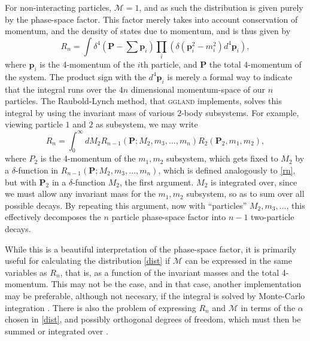 \documentclass[12pt, a4paper]{article}
\newcommand{\fvec}[1]{\boldsymbol{#1}}
\newcommand{\me}{\ensuremath{\mathcal{M}}}
\begin{document}
For non-interacting particles, $\me=1$, and as such the distribution is given purely by the phase-space factor. This factor merely takes into account conservation of momentum, and the density of states due to momentum, and is thus given by
\begin{equation}
R_n = \int  \delta^4(\fvec{P}- \sum \fvec{p}_i) \prod_i\left( \delta(\fvec{p}_i^2 - m_i^2)d^4\fvec{p}_i\right),\label{rn}
\end{equation}
where $\fvec{p}_i$ is the 4-momentum of the $i$th particle, and $\fvec{P}$ the total 4-momentum of the system. The product sign with the $d^4\fvec{p}_i$ is merely a formal way to indicate that the integral runs over the $4n$ dimensional momentum-space of our $n$ particles. The Raubold-Lynch method, that \textsc{ggland} implements, solves this integral by using the invariant mass of various $2$-body subsystems. For example, viewing particle $1$ and $2$ as subsystem, we may write
\begin{equation}
R_n = \int_0^\infty dM_2 R_{n-1}(\fvec{P};M_2,m_3,\dots,m_n) R_2(\fvec{P}_2,m_1,m_2),
\end{equation}
where $P_2$ is the 4-momentum of the $m_1,m_2$ subsystem, which gets fixed to $M_2$ by a $\delta$-function in $R_{n-1}(\fvec{P};M_2,m_3,\dots,m_n)$, which is defined analogously to \eqref{rn}, but with $\fvec{P}_2$ in a $\delta$-function $M_2$, the first argument. $M_2$ is integrated over, since we must allow any invariant mass for the $m_1,m_2$ subsystem, so as to sum over all possible decays.
By repeating this argument, now with ``particles'' $M_2,m_3,\dots$, this effectively decomposes the $n$ particle phase-space factor into $n-1$ two-particle decays.

While this is a beautiful interpretation of the phase-space factor, it is primarily useful for calculating the distribution \eqref{dist} if \me{} can be expressed in the same variables as $R_n$, that is, as a function of the invariant masses and the total 4-momentum. This may not be the case, and in that case, another implementation may be preferable, although not necesary, if the integral is solved by Monte-Carlo integration \cite{phasespace}. There is also the problem of expressing $R_n$ and \me{} in terms of the $\alpha$ chosen in \eqref{dist}, and possibly orthogonal degrees of freedom, which must then be summed or integrated over \cite{phasespace}.

\end{document}
